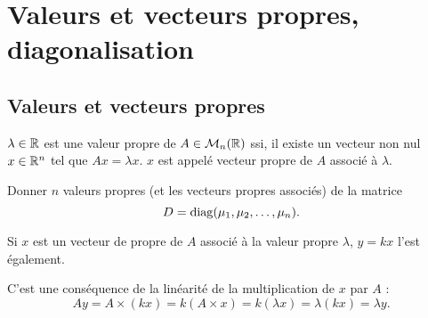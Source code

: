 \section{Valeurs et vecteurs propres, diagonalisation} \label{sec:LinAlg-Eigen}

\subsection{Valeurs et vecteurs propres} \label{sec:ValVecPropres}

\begin{definition}
  $\lambda \in \mathbb{R}$ est une valeur propre de $A \in \mathcal{M}_n(\mathbb{R})$ ssi, il existe un vecteur non nul $x \in \mathbb{R}^n$ tel que $A x = \lambda x$. $x$ est appelé vecteur propre de $A$ associé à $\lambda$.
\end{definition}

\begin{exercise*}
  Donner $n$ valeurs propres (et les vecteurs propres associés) de la matrice 
  $$
  D = \operatorname{diag}(\mu_1, \mu_2, \dots, \mu_n).
  $$
\end{exercise*}


\begin{proposition}
  Si $x$ est un vecteur de propre de $A$ associé à la valeur propre $\lambda$, $y = k x$ l'est également.
\end{proposition}

\proof 
  C'est une conséquence de la linéarité de la multiplication de $x$ par $A$ : 
  $$
  A y = A \times (k x) = k (A \times x) = k (\lambda x) = \lambda (k x) = \lambda y.
  $$
\eproof

